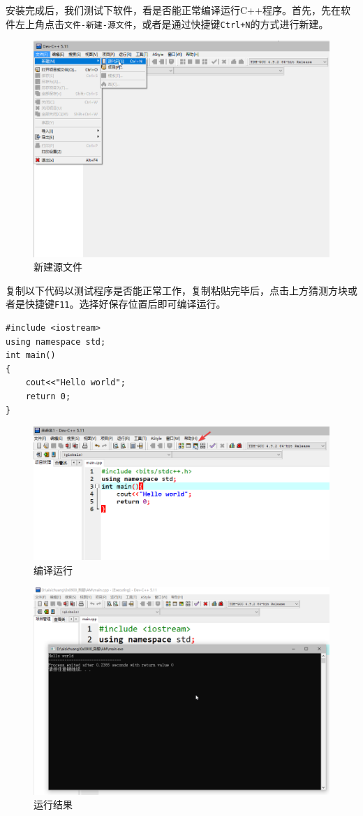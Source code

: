 安装完成后，我们测试下软件，看是否能正常编译运行C++程序。首先，先在软件左上角点击\texttt{文件-新建-源文件}，或者是通过快捷键\texttt{Ctrl+N}的方式进行新建。
\begin{figure}[H]
\centering
\includegraphics[width=0.6\linewidth]{01chapter/img/dev安装10}
\caption{新建源文件}
\label{fig:dev10}
\end{figure}
复制以下代码以测试程序是否能正常工作，复制粘贴完毕后，点击上方猜测方块或者是快捷键\texttt{F11}。选择好保存位置后即可编译运行。


\begin{verbatim}
#include <iostream>
using namespace std;
int main()
{
	cout<<"Hello world";
	return 0;
}
\end{verbatim}

\begin{figure}[H]
\centering
\includegraphics[width=0.6\linewidth]{01chapter/img/dev安装11}
\caption{编译运行}
\label{fig:dev11}
\end{figure}

\begin{figure}[H]
\centering
\includegraphics[width=0.6\linewidth]{01chapter/img/dev安装12}
\caption{运行结果}
\label{fig:dev12}
\end{figure}


